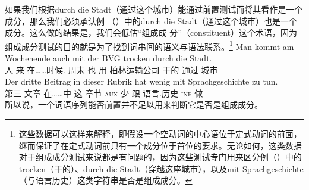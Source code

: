 如果我们根据durch die Stadt（通过这个城市）能通过前置测试而将其看作是一个成分，那么我们必须承认例
（）中的durch die Stadt（通过这个城市）也是一个成分。这么做的结果是，我们会低估“组成成
分”（constituent）这个术语，因为组成成分测试的目的就是为了找到词串间的语义与语法联系。\footnote{%
这些数据可以这样来解释，即假设一个空动词的中心语位于定式动词的前面，继而保证了在定式动词前只有一个成分位于首位的要求。\citep{Mueller2005d,MuellerGS}无论如何，这类数据对于组成成分测试来说都是有问题的，因为这些测试专门用来区分例（）中的trocken（干的）、durch die Stadt（穿越这座城市），以及mit Sprachgeschichte（与语言历史）这类字符串是否是组成成分。}
\eal
\ex 
\gll Man kommt am Wochenende auch mit der BVG trocken durch die Stadt.\\
     人 来 在……时候. 周末 也 用  柏林运输公司 干的 通过  城市\\
\ex 
\gll Der dritte Beitrag in dieser Rubrik hat wenig mit Sprachgeschichte zu tun.\\
      第三  文章 在……中 这 章节  \textsc{aux} 少 跟 语言.历史 \textsc{inf} 做\\
\zl
所以说，一个词语序列能否前置并不足以用来判断它是否是组成成分。

